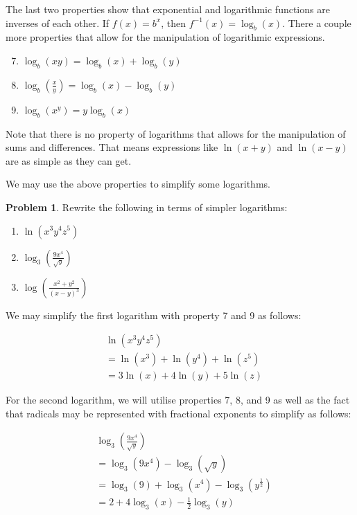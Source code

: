 \documentclass[12pt]{article}
\theoremstyle{definition}
\newtheorem{problem}{Problem}
\begin{document}
The last two properties show that exponential and logarithmic functions are inverses of each other.
If $f(x)=b^x$, then $f^{-1}(x)=\log_b(x)$.
There a couple more properties that allow for the manipulation of logarithmic expressions.

\begin{enumerate}
    \setcounter{enumi}{6}
    \item $\log_b(xy) = \log_b(x) + \log_b(y)$
    \item $\log_b\left(\frac{x}{y}\right) = \log_b(x) - \log_b(y)$
    \item $\log_b(x^y) = y\log_b(x)$
\end{enumerate}

Note that there is no property of logarithms that allows for the manipulation of sums and differences.
That means expressions like $\ln(x+y)$ and $\ln(x-y)$ are as simple as they can get.

We may use the above properties to simplify some logarithms.

\begin{problem}
Rewrite the following in terms of simpler logarithms:

\begin{enumerate}
    \item $\ln(x^3y^4z^5)$
    \item $\log_3\left(\frac{9x^4}{\sqrt{y}}\right)$
    \item $\log\left(\frac{x^2+y^2}{(x-y)^3}\right)$
\end{enumerate}
\end{problem}

We may simplify the first logarithm with property 7 and 9 as follows:

\begin{align}
     & \ln(x^3y^4z^5)                   \\
     & = \ln(x^3) + \ln(y^4) + \ln(z^5) \\
     & = 3\ln(x) + 4\ln(y) + 5\ln(z)
\end{align}

For the second logarithm, we will utilise properties 7, 8, and 9 as well as the fact that radicals may be represented with fractional exponents to simplify as follows:

\begin{align}
     & \log_3\left(\frac{9x^4}{\sqrt{y}}\right)          \\
     & = \log_3(9x^4) - \log_3(\sqrt{y})                 \\
     & = \log_3(9) + \log_3(x^4) - \log_3(y^\frac{1}{2}) \\
     & = 2 + 4\log_3(x) - \frac{1}{2} \log_3(y)
\end{align}
\end{document}
